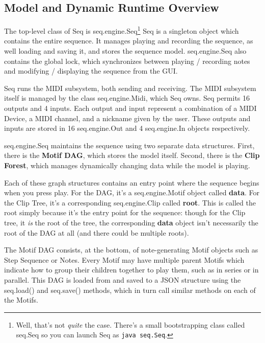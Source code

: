 \documentclass[twoside,10pt]{article}
\begin{document}
\subsection{Model and Dynamic Runtime Overview}

The top-level class of Seq is {\sf seq.engine.Seq}\footnote{Well, that's not {\it quite} the case.  There's a small bootstrapping class called {\sf seq.Seq} so you can launch Seq as {\tt java seq.Seq}.}  Seq is a singleton object which contains the entire sequence.  It manages playing and recording the sequence,  as well loading and saving it, and stores the sequence model.  {\sf seq.engine.Seq} also contains the global lock, which synchronizes between playing / recording notes and modifying / displaying the sequence from the GUI.

Seq runs the MIDI subsystem, both sending and receiving.  The MIDI subsystem itself is managed by the class {\sf seq.engine.Midi}, which Seq owns.  Seq permits 16 outputs and 4 inputs.  Each output and input represent a combination of a MIDI Device, a MIDI channel, and a nickname given by the user.  These outputs and inputs are stored in 16 {\sf seq.engine.Out} and 4 {\sf seq.engine.In} objects respectively.

{\sf seq.engine.Seq} maintains the sequence using two separate data structures.  First, there is the {\bf Motif DAG}, which stores the model itself.  Second, there is the {\bf Clip Forest}, which manages dynamically changing data while the model is playing.  

Each of these graph structures contains an entry point where the sequence begins when you press play.  For the DAG, it's a {\sf seq.engine.Motif} object called {\bf data}.  For the Clip Tree, it's a corresponding {\sf seq.engine.Clip} called {\bf root}.  This is called the root simply because it's the entry point for the sequence: though for the Clip tree, it {\it is} the root of the tree, the corresponding {\bf data} object isn't necessarily the root of the DAG at all (and there could be multiple roots).

The Motif DAG consists, at the bottom, of note-generating Motif objects such as Step Sequence or Notes.  Every Motif may have multiple parent Motifs which indicate how to group their children together to play them, such as in series or in parallel.  This DAG is loaded from and saved to a JSON structure using the {\sf seq.load()} and {\sf seq.save()} methods, which in turn call similar methods on each of the Motifs.
\end{document}
